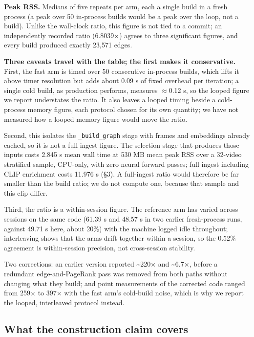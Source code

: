 \documentclass[sigconf,review,anonymous]{acmart}
\begin{document}
\textbf{Peak RSS.} Medians of five repeats per arm, each a single build in a fresh process (a
peak over 50 in-process builds would be a peak over the loop, not a build). Unlike the
wall-clock ratio, this figure is not tied to a commit; an independently recorded ratio
(6.8039\ensuremath{\times}) agrees to three significant figures, and every build produced exactly 23,571 edges.

\textbf{Three caveats travel with the table; the first makes it conservative.} First, the fast
arm is timed over 50 consecutive in-process builds, which lifts it above timer resolution but
adds about 0.09 s of fixed overhead per iteration; a single cold build, as production performs,
measures \ensuremath{\approx}0.12 s, so the looped figure we report understates the ratio. It
also leaves a looped timing beside a cold-process memory figure, each protocol chosen for its
own quantity; we have not measured how a looped memory figure would move the ratio.

Second, this isolates the \texttt{\_build\_graph} stage with frames and embeddings already cached, so
it is not a full-ingest figure. The selection stage that produces those inputs costs 2.845 s
mean wall time at 530 MB mean peak RSS over a 32-video stratified sample, CPU-only, with
zero neural forward passes; full ingest including CLIP enrichment costs
11.976 s (§3). A full-ingest ratio would therefore be far smaller than the build ratio; we do
not compute one, because that sample and this clip differ.

Third, the ratio is a within-session figure. The reference arm has varied across sessions on
the same code (61.39 s and 48.57 s in two earlier fresh-process runs, against 49.71 s here,
about 20\%) with the machine logged idle throughout; interleaving shows that the arms drift
together within a session, so the 0.52\% agreement is within-session precision, not
cross-session stability.

Two corrections: an earlier version reported \textasciitilde220\ensuremath{\times} and \textasciitilde6.7\ensuremath{\times}, before a redundant
edge-and-PageRank pass was removed from both paths without changing what they build; and
point measurements of the corrected code ranged from 259\ensuremath{\times} to 397\ensuremath{\times} with the fast arm's
cold-build noise, which is why we report the looped, interleaved protocol instead.

\subsection{What the construction claim covers}
\end{document}
